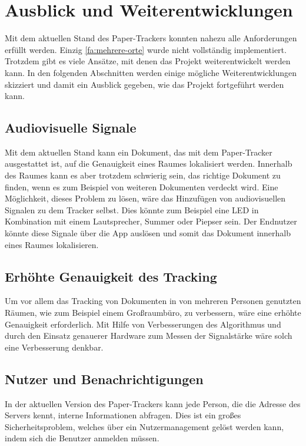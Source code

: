 \chapter{Ausblick und Weiterentwicklungen}

Mit dem aktuellen Stand des Paper-Trackers konnten nahezu alle Anforderungen erfüllt werden. Einzig \ref*{fa:mehrere-orte} wurde nicht vollständig implementiert.
Trotzdem gibt es viele Ansätze, mit denen das Projekt weiterentwickelt werden kann.
In den folgenden Abschnitten werden einige mögliche Weiterentwicklungen skizziert und damit ein Ausblick gegeben,
wie das Projekt fortgeführt werden kann.

\section{Audiovisuelle Signale}

Mit dem aktuellen Stand kann ein Dokument, das mit dem Paper-Tracker ausgestattet ist, auf die Genauigkeit eines Raumes
lokalisiert werden.
Innerhalb des Raumes kann es aber trotzdem schwierig sein, das richtige Dokument zu finden, wenn es zum Beispiel von
weiteren Dokumenten verdeckt wird.
Eine Möglichkeit, dieses Problem zu lösen, wäre das Hinzufügen von audiovisuellen Signalen zu dem Tracker selbst.
Dies könnte zum Beispiel eine \gls{LED} in Kombination mit einem Lautsprecher, Summer oder Piepser sein.
Der Endnutzer könnte diese Signale über die App auslösen und somit das Dokument innerhalb eines Raumes lokalisieren.

\section{Erhöhte Genauigkeit des Tracking}

Um vor allem das Tracking von Dokumenten in von mehreren Personen genutzten Räumen, wie zum Beispiel einem Großraumbüro,
zu verbessern, wäre eine erhöhte Genauigkeit erforderlich.
Mit Hilfe von Verbesserungen des Algorithmus und durch den Einsatz genauerer Hardware zum Messen der Signalstärke wäre solch eine Verbesserung denkbar.

\section{Nutzer und Benachrichtigungen}

In der aktuellen Version des Paper-Trackers kann jede Person, die die Adresse des Servers kennt, interne Informationen
abfragen.
Dies ist ein großes Sicherheitsproblem, welches über ein Nutzermanagement gelöst werden kann, indem sich die Benutzer
anmelden müssen.

